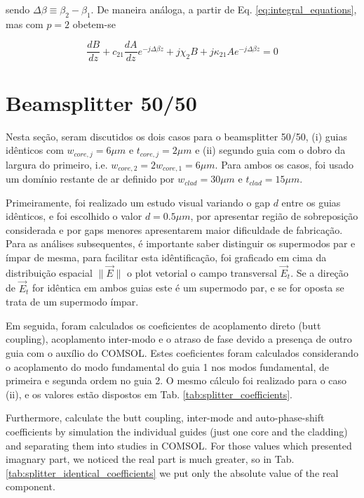 \documentclass[final,12pt,times,twocolumn]{elsarticle}
\begin{document}
sendo $\Delta\beta\equiv\beta_2-\beta_1$. De maneira análoga, a partir de Eq. \eqref{eq:integral_equations}, mas com $p=2$ obetem-se

\begin{equation}
\frac{dB}{dz} + c_{21}\frac{dA}{dz}e^{-j\Delta\beta z} + j\chi_2B + j\kappa_{21}Ae^{-j\Delta\beta z} = 0
\end{equation} 

\section{Beamsplitter 50/50}
\label{sec:splitter}

Nesta seção, seram discutidos os dois casos para o beamsplitter 50/50, (i) guias idênticos com $w_{core,j} = 6\mu m$ e $t_{core, j} = 2\mu m$ e (ii) segundo guia com o dobro da largura do primeiro, i.e. $w_{core,2} = 2w_{core,1} = 6\mu m$. Para ambos os casos, foi usado um domínio restante de ar definido por $w_{clad} = 30\mu m$ e $t_{clad} = 15\mu m$.

Primeiramente, foi realizado um estudo visual variando o gap $d$ entre os guias idênticos, e foi escolhido o valor $d = 0.5\mu m$, por apresentar região de sobreposição considerada e por gaps menores apresentarem maior dificuldade de fabricação. Para as análises subsequentes, é importante saber distinguir os supermodos par e ímpar de mesma, para facilitar esta idêntificação, foi graficado em cima da distribuição espacial $\| \vec{E} \|$ o plot vetorial o campo transversal $\vec{E}_t$. Se a direção de $\vec{E}_t$ for idêntica em ambos guias este é um supermodo par, e se for oposta se trata de um supermodo ímpar.

Em seguida, foram calculados os coeficientes de acoplamento direto (butt coupling), acoplamento inter-modo e o atraso de fase devido a presença de outro guia com o auxílio do COMSOL. Estes coeficientes foram calculados considerando o acoplamento do modo fundamental do guia 1 nos modos fundamental, de primeira e segunda ordem no guia 2. O mesmo cálculo foi realizado para o caso (ii), e os valores estão dispostos em Tab. \ref{tab:splitter_coefficients}. 

Furthermore, calculate the butt coupling, inter-mode and auto-phase-shift coefficients by simulation the individual guides (just one core and the cladding) and separating them into studies in COMSOL. For those values which presented imagnary part, we noticed the real part is much greater, so in Tab. \ref{tab:splitter_identical_coefficients} we put only the absolute value of the real component.
\end{document}
